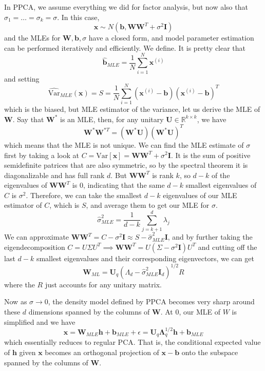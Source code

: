 \documentclass{article}
\begin{document}
    \begin{example} 
    In PPCA, we assume everything we did for factor analysis, but now also that $\sigma_1 = \ldots = \sigma_k = \sigma$. In this case, 
    \[\mathbf{x} \sim N(\mathbf{b}, \mathbf{W}\mathbf{W}^T + \sigma^2 \mathbf{I})\]
    and the MLEs for $\mathbf{W}, \mathbf{b}, \sigma$ have a closed form, and model parameter estimation can be performed iteratively and efficiently. We define. It is pretty clear that 
    \[\hat{\mathbf{b}}_{MLE} = \frac{1}{N} \sum_{i=1}^N \mathbf{x}^{(i)}\]
    and setting 
    \[\widehat{\mathrm{Var}}_{MLE}(\mathbf{x}) = S = \frac{1}{N} \sum_{i=1}^N (\mathbf{x}^{(i)} - \mathbf{b}) (\mathbf{x}^{(i)} - \mathbf{b})^T\]
    which is the biased, but MLE estimator of the variance, let us derive the MLE of $\mathbf{W}$. Say that $\mathbf{W}^\ast$ is an MLE, then, for any unitary $\mathbf{U} \in \mathbb{R}^{k \times k}$, we have 
    \[\mathbf{W}^\ast \mathbf{W}^{\ast T} = (\mathbf{W}^\ast \mathbf{U}) (\mathbf{W}^\ast \mathbf{U})^T \]
    which means that the MLE is not unique. We can find the MLE estimate of $\sigma$ first by taking a look at $C = \mathrm{Var}[\mathbf{x}] = \mathbf{W} \mathbf{W}^T + \sigma^2 \mathbf{I}$. It is the sum of positive semidefinite patrices that are also symmetric, so by the spectral theorem it is diagonalizable and has full rank $d$. But $\mathbf{W} \mathbf{W}^T$ is rank $k$, so $d - k$ of the eigenvalues of $\mathbf{W} \mathbf{W}^T$ is $0$, indicating that the same $d-k$ smallest eigenvalues of $C$ is $\sigma^2$. Therefore, we can take the smallest $d-k$ eigenvalues of our MLE estimator of $C$, which is $S$, and average them to get our MLE for $\sigma$. 
    \[\hat{\sigma}^2_{MLE} = \frac{1}{d-k} \sum_{j=k+1}^d \lambda_j\]
    We can approximate $\mathbf{W} \mathbf{W}^T = C - \sigma^2 \mathbf{I} \approx S - \hat{\sigma}^2_{MLE} \mathbf{I}$, and by further taking the eigendecomposition $C = U \Sigma U^T \implies \mathbf{W} \mathbf{W}^T = U (\Sigma - \sigma^2 \mathbf{I}) U^T$ and cutting off the last $d-k$ smallest eigenvalues and their corresponding eigenvectors, we can get 
    \[\mathbf{W}_{ML} = \mathbf{U}_q (\Lambda_d - \hat{\sigma}_{MLE}^2 \mathbf{I}_d )^{1/2} R\] 
    where the $R$ just accounts for any unitary matrix. 
    \end{example}

    Now as $\sigma \rightarrow 0$, the density model defined by PPCA becomes very sharp around these $d$ dimensions spanned by the columns of $\mathbf{W}$. At $0$, our MLE of $W$ is simplified and we have 
    \[\mathbf{x} = \mathbf{W}_{MLE} \mathbf{h} + \mathbf{b}_{MLE} + \epsilon = \mathbf{U}_q \boldsymbol{\Lambda}_q^{1/2} \mathbf{h} + \mathbf{b}_{MLE} \]
    which essentially reduces to regular PCA. That is, the conditional expected value of $\mathbf{h}$ given $\mathbf{x}$ becomes an orthogonal projection of $\mathbf{x} - \mathbf{b}$ onto the subspace spanned by the columns of $\mathbf{W}$.  
\end{document}
